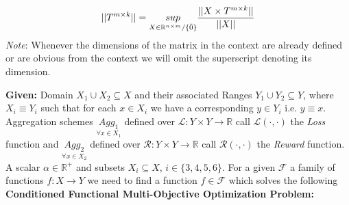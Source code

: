 \begin{equation}
   ||T^{m\times k}|| = \underset{X \in \mathbb{R}^{n\times m}/\{\Bar{0}\}}{sup} \frac{||X\times T^{m\times k}||}{||X||}
\end{equation}
\textit{Note}: Whenever the dimensions of the matrix in the context are already defined or are obvious from the context we will omit the superscript denoting its dimension.
\newpage 

 \label{prob_def}
\textbf{Given:}
\newline Domain $X_1\cup X_2 \subseteq X$ and their associated Ranges $Y_1\cup Y_2 \subseteq Y$, where $X_i\equiv Y_i$ such that for each $x \in X_i$ we have a corresponding $y \in Y_i$ i.e. $y\equiv x$.
\newline Aggregation schemes $\underset{\forall x\in X_1}{Agg_1}$ defined over $\mathcal{L}: Y \times Y \to \mathbb{R}$ call $\mathcal{L}(\cdot,\cdot)$ the \textit{Loss} function and $\underset{\forall x\in X_2}{Agg_2}$ defined over $\mathcal{R}: Y \times Y \to \mathbb{R}$ call $\mathcal{R}(\cdot,\cdot)$  the \textit{Reward} function.\newline
A scalar $\alpha \in \mathbb{R^+}$ and subsets $X_i \subseteq X$, $i \in \{3,4,5,6\}$.\newline
For a given $\mathcal{F}$ a family of functions $f: X \to Y$ we need to find a function $f \in \mathcal{F}$ which solves the following \newline\newline \textbf{Conditioned Functional Multi-Objective Optimization Problem:}

